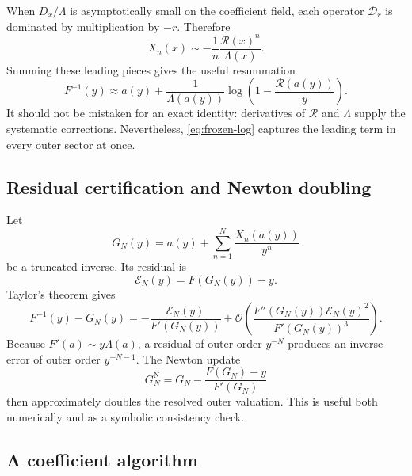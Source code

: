 \documentclass[11pt,a4paper]{article}
\numberwithin{equation}{section}
\theoremstyle{definition}
\theoremstyle{remark}
\newcommand{\Ord}{\mathcal O}
\newcommand{\Lam}{\Lambda}
\newcommand{\Res}{\mathcal R}
\begin{document}
When $D_x/\Lam$ is asymptotically small on the coefficient field, each
operator $\mathscr D_r$ is dominated by multiplication by $-r$.  Therefore
\begin{equation}\label{eq:Xn-leading-general}
 X_n(x)\sim-\frac1n\frac{\Res(x)^n}{\Lam(x)}.
\end{equation}
Summing these leading pieces gives the useful resummation
\begin{equation}\label{eq:frozen-log}
 F^{-1}(y)\approx a(y)+\frac1{\Lam(a(y))}
 \log\left(1-\frac{\Res(a(y))}{y}\right).
\end{equation}
It should not be mistaken for an exact identity: derivatives of $\Res$ and
$\Lam$ supply the systematic corrections.  Nevertheless,
\eqref{eq:frozen-log} captures the leading term in every outer sector at
once.

\subsection{Residual certification and Newton doubling}

Let
\begin{equation}\label{eq:GN-general}
 G_N(y)=a(y)+\sum_{n=1}^{N}\frac{X_n(a(y))}{y^n}
\end{equation}
be a truncated inverse.  Its residual is
\begin{equation}\label{eq:inverse-residual}
 \mathcal E_N(y)=F(G_N(y))-y.
\end{equation}
Taylor's theorem gives
\begin{equation}\label{eq:residual-to-error}
 F^{-1}(y)-G_N(y)
 =-\frac{\mathcal E_N(y)}{F'(G_N(y))}
 +\Ord\!\left(
 \frac{F''(G_N(y))\mathcal E_N(y)^2}{F'(G_N(y))^3}
 \right).
\end{equation}
Because $F'(a)\sim y\Lam(a)$, a residual of outer order $y^{-N}$ produces
an inverse error of outer order $y^{-N-1}$.  The Newton update
\begin{equation}\label{eq:Newton-general}
 G_N^{\mathrm N}=G_N-\frac{F(G_N)-y}{F'(G_N)}
\end{equation}
then approximately doubles the resolved outer valuation.  This is useful
both numerically and as a symbolic consistency check.

\subsection{A coefficient algorithm}
\end{document}
